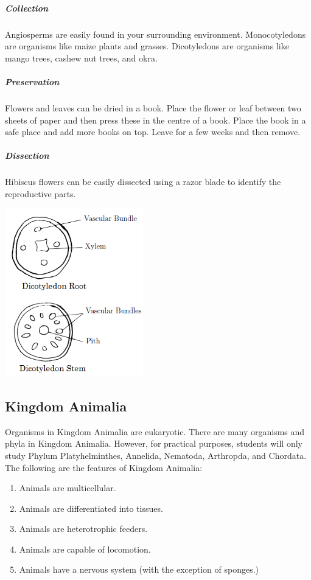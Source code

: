 \begin{multicols}{2}
\subparagraph{Collection}
Angiosperms are easily found in your surrounding environment. Monocotyledons are organisms like maize plants and grasses. Dicotyledons are organisms like mango trees, cashew nut trees, and okra.

\subparagraph{Preservation} 
Flowers and leaves can be dried in a book. Place the flower or leaf between two sheets of paper and then press these in the centre of a book. Place the book in a safe place and add more books on top. Leave for a few weeks and then remove.

\subparagraph{Dissection}
Hibiscus flowers can be easily dissected using a razor blade to identify the reproductive parts.

\begin{center}
\includegraphics[width=0.45\textwidth]{./img/dicotyledon.png}
\end{center}

\end{multicols}

\setcounter{secnumdepth}{3}

\pagebreak

\subsection{Kingdom Animalia}
Organisms in Kingdom Animalia are eukaryotic. There are many organisms and phyla in Kingdom Animalia. However, for practical purposes, students will only study Phylum Platyhelminthes, Annelida, Nematoda, Arthropda, and Chordata.\\
The following are the features of Kingdom Animalia:
\begin{enumerate}
\item{Animals are multicellular.}
\item{Animals are differentiated into tissues.}
\item{Animals are heterotrophic feeders.}
\item{Animals are capable of locomotion.}
\item{Animals have a nervous system (with the exception of sponges.)}
\end{enumerate}


